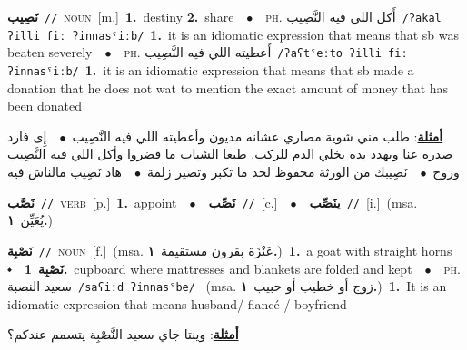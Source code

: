 \documentclass[10pt,a4paper,twoside]{article} %
\begin{document}
\begin{multicols}{2}
{\setlength\topsep{0pt}\textbf{\foreignlanguage{arabic}{نَصِيب}}\ {\color{gray}\texttt{//}\color{black}}\ \textsc{noun}\ [m.]\ \textbf{1.}~destiny  \textbf{2.}~share\ \ $\bullet$\ \ \textsc{ph.} \color{gray} \foreignlanguage{arabic}{أَكل اللي فيه النَّصِيب}\color{black}\ {\color{gray}\texttt{/{\sffamily ʔakal ʔilli fiː ʔinnasˤiːb}/}\color{black}}\ \textbf{1.}~it is an idiomatic expression that means that sb was beaten severely\ \ $\bullet$\ \ \textsc{ph.} \color{gray} \foreignlanguage{arabic}{أَعطيته اللي فيه النَّصِيب}\color{black}\ {\color{gray}\texttt{/{\sffamily ʔaʕtˤeːto ʔilli fiː ʔinnasˤiːb}/}\color{black}}\ \textbf{1.}~it is an idiomatic expression that means that sb made a donation that he does not wat to mention the exact amount of money that has been donated\  \begin{flushright}\color{gray}\foreignlanguage{arabic}{\textbf{\underline{\foreignlanguage{arabic}{أمثلة}}}: طلب مني شوية مصاري عشانه مديون وأعطيته اللي فيه النَّصِيب\ $\bullet$\ \  إِى فارد صدره عنا وبهدد بده يخلي الدم للركب. طبعا الشباب ما قضروا وأكل اللي فيه النَّصِيب وروح\ $\bullet$\ \  نَصِيبك من الورثة محفوظ لحد ما تكبر وتصير زلمة\ $\bullet$\ \  هاد نَصِيب مالناش فيه}\end{flushright}\color{black}} \vspace{2mm}

{\setlength\topsep{0pt}\textbf{\foreignlanguage{arabic}{نَصَّب}}\ {\color{gray}\texttt{//}\color{black}}\ \textsc{verb}\ [p.]\ \textbf{1.}~appoint\ \ $\bullet$\ \ \setlength\topsep{0pt}\textbf{\foreignlanguage{arabic}{نَصِّب}}\ {\color{gray}\texttt{//}\color{black}}\ [c.]\ \ $\bullet$\ \ \setlength\topsep{0pt}\textbf{\foreignlanguage{arabic}{ينَصِّب}}\ {\color{gray}\texttt{//}\color{black}}\ [i.]\ \color{gray}(msa. \foreignlanguage{arabic}{يُعَيِّن}~\foreignlanguage{arabic}{\textbf{١.}})\color{black}\ } \vspace{2mm}

{\setlength\topsep{0pt}\textbf{\foreignlanguage{arabic}{نَصْبِة}}\ {\color{gray}\texttt{//}\color{black}}\ \textsc{noun}\ [f.]\ \color{gray}(msa. \foreignlanguage{arabic}{عَنْزَة بقرون مستقيمة}~\foreignlanguage{arabic}{\textbf{١.}})\color{black}\ \textbf{1.}~a goat with straight horns\ \ $\smblkdiamond$\ \ \setlength\topsep{0pt}\textbf{\foreignlanguage{arabic}{نَصْبِة}}\ \textbf{1.}~cupboard where mattresses and blankets are folded and kept\ \ $\bullet$\ \ \textsc{ph.} \color{gray} \foreignlanguage{arabic}{سعيد النصبة}\color{black}\ {\color{gray}\texttt{/{\sffamily saʕiːd ʔinnasˤbe}/}\color{black}}\ \color{gray} (msa. \foreignlanguage{arabic}{زوج أو خطيب أو حبيب}~\foreignlanguage{arabic}{\textbf{١.}})\color{black}\ \textbf{1.}~It is an idiomatic expression that means husband/ fiancé / boyfriend\  \begin{flushright}\color{gray}\foreignlanguage{arabic}{\textbf{\underline{\foreignlanguage{arabic}{أمثلة}}}: وينتا جاي سعيد النَّصْبِة يتسمم عندكم؟}\end{flushright}\color{black}} \vspace{2mm}


\end{multicols}
\end{document}
